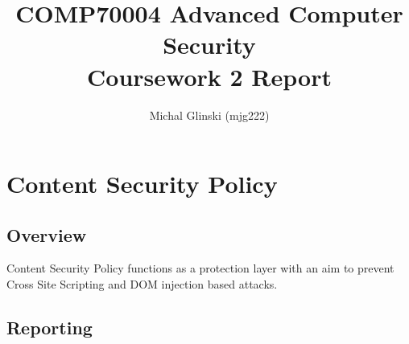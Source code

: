 \documentclass[11]{article}   %
\begin{document}
\title{COMP70004 Advanced Computer Security\\Coursework 2 Report} 
\author{Michal Glinski (mjg222)}    

\maketitle

\section{Content Security Policy}
\subsection{Overview}
Content Security Policy functions as a protection layer with an aim to prevent Cross Site Scripting and DOM injection based attacks. 
\subsection{Reporting}
\end{document}
